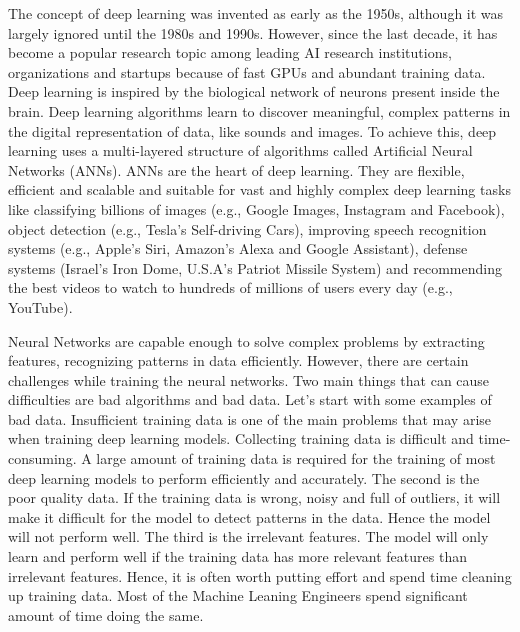 The concept of deep learning was invented as early as the 1950s, although it was largely ignored until the 1980s and 1990s. However, since the last decade, it has become a popular research topic among leading \ac{AI} research institutions, organizations and startups because of fast GPUs and abundant training data. Deep learning is inspired by the biological network of neurons present inside the brain. Deep learning algorithms learn to discover meaningful, complex patterns in the digital representation of data, like sounds and images. To achieve this, deep learning uses a multi-layered structure of algorithms called Artificial Neural Networks (\acp{ANN}). \acp{ANN} are the heart of deep learning. They are flexible, efficient and scalable and suitable for vast and highly complex deep learning tasks like classifying billions of images (e.g., Google Images, Instagram and Facebook), object detection (e.g., Tesla's Self-driving Cars), improving speech recognition systems (e.g., Apple's Siri, Amazon's Alexa and Google Assistant), defense systems (Israel's Iron Dome, U.S.A's Patriot Missile System) and recommending the best videos to watch to hundreds of millions of users every day (e.g., YouTube).

Neural Networks are capable enough to solve complex problems by extracting features, recognizing patterns in data efficiently. However, there are certain challenges while training the neural networks. Two main things that can cause difficulties are bad algorithms and bad data. Let's start with some examples of bad data. Insufficient training data is one of the main problems that may arise when training deep learning models. Collecting training data is difficult and time-consuming. A large amount of training data is required for the training of most deep learning models to perform efficiently and accurately. The second is the poor quality data. If the training data is wrong, noisy and full of outliers, it will make it difficult for the model to detect patterns in the data. Hence the model will not perform well. The third is the irrelevant features. The model will only learn and perform well if the training data has more relevant features than irrelevant features. Hence, it is often worth putting effort and spend time cleaning up training data. Most of the Machine Leaning Engineers spend significant amount of time doing the same. 

